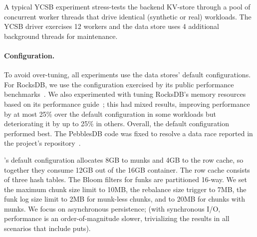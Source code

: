 
A typical YCSB experiment stress-tests the backend KV-store through a pool of concurrent worker threads that drive identical
(synthetic or real) workloads. The YCSB driver  
exercises 12 workers and the data store uses 4 additional background   threads for maintenance.







\paragraph{Configuration.} 
To avoid over-tuning, all experiments use the data stores' default configurations. For RocksDB, we use the configuration exercised by its public 
performance benchmarks~\cite{RocksDBPerf}. 
We also experimented with tuning RocksDB's memory resources based on its performance guide~\cite{RocksDBMemoryTuning}; 
this had mixed results, improving performance by at most 25\% over the default configuration in some workloads but 
deteriorating it by up to 25\% in others. Overall, the default configuration performed best. 
The PebblesDB code was fixed to resolve a data race reported in the project's repository~\cite{pebbles-git-issue}. 

\sys's default configuration 
allocates 8GB to munks and 4GB to the row cache,
so together they consume 12GB out of the 16GB container. 
The row cache consists of three hash tables.  
The Bloom filters for funks are partitioned 16-way.  
We set the \sys\/ maximum chunk size limit to 10MB, the rebalance size trigger to 7MB, 
the funk log size limit to 2MB for munk-less chunks, and to 20MB for chunks with munks. 
We focus on  asynchronous persistence; (with synchronous I/O, performance is
an order-of-magnitude slower, trivializing the results in all scenarios that include puts). 



